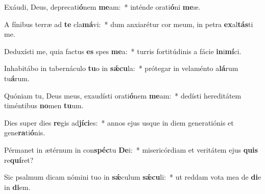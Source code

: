 \item Exáudi, Deus, deprecati\textbf{ó}nem \textbf{me}am:~* inténde orati\textbf{ó}ni \textbf{me}æ.
\item A fínibus terræ ad \textbf{te} cla\textbf{má}vi:~* dum anxiarétur cor meum, in petra \textbf{ex}al\textbf{tás}ti me.
\item Deduxísti me, quia factus \textbf{es} spes \textbf{me}a:~* turris fortitúdinis a fácie \textbf{in}i\textbf{mí}ci.
\item Inhabitábo in tabernáculo \textbf{tu}o in \textbf{sǽ}\textbf{cu}la:~* prótegar in velaménto a\textbf{lá}rum tu\textbf{á}rum.
\item Quóniam tu, Deus meus, exaudísti orati\textbf{ó}nem \textbf{me}am:~* dedísti hereditátem timéntibus \textbf{no}men \textbf{tu}um.
\item Dies super dies \textbf{re}gis ad\textbf{jí}\textbf{ci}es:~* annos ejus usque in diem generatiónis et gene\textbf{ra}ti\textbf{ó}nis.
\item Pérmanet in ætérnum in con\textbf{spéc}tu \textbf{De}i:~* misericórdiam et veritátem ejus \textbf{quis} re\textbf{quí}ret?
\item Sic psalmum dicam nómini tuo in \textbf{sǽ}culum \textbf{sǽ}\textbf{cu}li:~* ut reddam vota mea de \textbf{di}e in \textbf{di}em.
